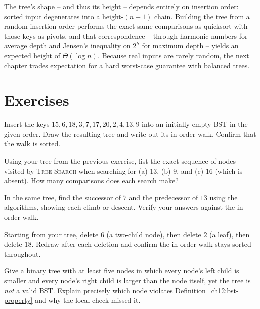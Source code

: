 The tree's shape -- and thus its height -- depends entirely on insertion order: sorted input
degenerates into a height-$(n-1)$ chain. Building the tree from a random insertion order performs
the exact same comparisons as quicksort with those keys as pivots, and that correspondence --
through harmonic numbers for average depth and Jensen's inequality on $2^h$ for maximum depth --
yields an expected height of $\Theta(\log n)$. Because real inputs are rarely random, the next
chapter trades expectation for a hard worst-case guarantee with balanced trees.

\section{Exercises}

\begin{exercise}
Insert the keys $15, 6, 18, 3, 7, 17, 20, 2, 4, 13, 9$ into an initially empty BST in the given
order. Draw the resulting tree and write out its in-order walk. Confirm that the walk is sorted.
\end{exercise}

\begin{exercise}
Using your tree from the previous exercise, list the exact sequence of nodes visited by
\textsc{Tree-Search} when searching for (a) $13$, (b) $9$, and (c) $16$ (which is absent). How
many comparisons does each search make?
\end{exercise}

\begin{exercise}
In the same tree, find the successor of $7$ and the predecessor of $13$ using the algorithms,
showing each climb or descent. Verify your answers against the in-order walk.
\end{exercise}

\begin{exercise}
Starting from your tree, delete $6$ (a two-child node), then delete $2$ (a leaf), then delete
$18$. Redraw after each deletion and confirm the in-order walk stays sorted throughout.
\end{exercise}

\begin{exercise}
Give a binary tree with at least five nodes in which every node's left child is smaller and
every node's right child is larger than the node itself, yet the tree is \emph{not} a valid BST.
Explain precisely which node violates Definition~\ref{ch12:bst-property} and why the local check
missed it.
\end{exercise}

